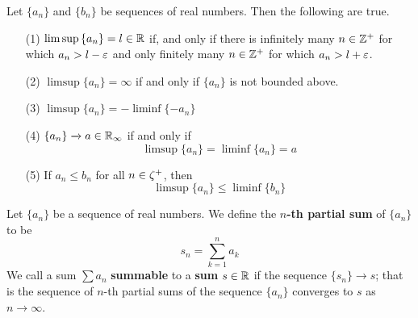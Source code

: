 \begin{lemma}\label{1.3.6}
    Let $\{a_n\}$ and $\{b_n\}$ be sequences of real numbers. Then the following
    are true.
    \begin{enumerate}
        \item[(1)] $\limsup{\{a_n\}}=l \in \mathbb{R}$ if, and only if there is
            infinitely many  $n \in \mathbb{Z}^+$ for which  $a_n>l-\varepsilon$ and only
            finitely many $n \in \mathbb{Z}^+$ for which $a_n>l+\varepsilon$.

        \item[(2)] $\limsup{\{a_n\}}=\infty$ if and only if $\{a_n\}$ is not
            bounded above.

        \item[(3)] $\limsup{\{a_n\}}=-\liminf{\{-a_n\}}$

        \item[(4)] $\{a_n\} \xrightarrow{} a \in \mathbb{R}_\infty$ if and only if
            \begin{equation*}
                \limsup{\{a_n\}}=\liminf{\{a_n\}}=a
            \end{equation*}

        \item[(5)] If $a_n \leq b_n$ for all  $n \in \zeta^+$, then
            \begin{equation*}
                \limsup{\{a_n\}} \leq \liminf{\{b_n\}}
            \end{equation*}
    \end{enumerate}
\end{lemma}

\begin{definition}
    Let $\{a_n\}$ be a sequence of real numbers. We define the \textbf{$n$-th
    partial sum} of $\{a_n\}$ to be
    \begin{equation*}
        s_n=\sum_{k=1}^n{a_k}
    \end{equation*}
    We call a sum $\sum{a_n}$ \textbf{summable} to a \textbf{sum} $s \in \mathbb{R}$ if
    the sequence $\{s_n\} \xrightarrow{} s$; that is the sequence of $n$-th
    partial sums of the sequence  $\{a_n\}$ converges to $s$ as  $n
    \xrightarrow{} \infty$.
\end{definition}


